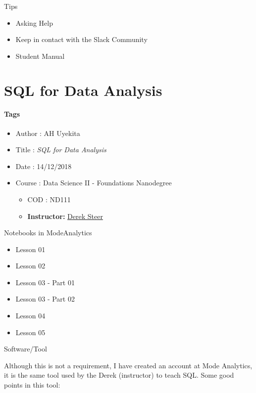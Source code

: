 \documentclass[]{book}
\providecommand{\tightlist}{%
  \setlength{\itemsep}{0pt}\setlength{\parskip}{0pt}}
\begin{document}
Tips

\begin{itemize}
\tightlist
\item
  Asking Help
\item
  Keep in contact with the Slack Community
\item
  Student Manual
\end{itemize}

\chapter{SQL for Data Analysis}\label{sql-for-data-analysis}

\subsubsection*{Tags}\label{tags}

\begin{itemize}
\tightlist
\item
  Author : AH Uyekita
\item
  Title : \emph{SQL for Data Analysis}
\item
  Date : 14/12/2018
\item
  Course : Data Science II - Foundations Nanodegree

  \begin{itemize}
  \tightlist
  \item
    COD : ND111
  \item
    \textbf{Instructor:} \href{https://modeanalytics.com}{Derek Steer}
  \end{itemize}
\end{itemize}

Notebooks in ModeAnalytics

\begin{itemize}
\tightlist
\item
  Lesson 01
\item
  Lesson 02
\item
  Lesson 03 - Part 01
\item
  Lesson 03 - Part 02
\item
  Lesson 04
\item
  Lesson 05
\end{itemize}

Software/Tool

Although this is not a requirement, I have created an account at Mode
Analytics, it is the same tool used by the Derek (instructor) to teach
SQL. Some good points in this tool:
\end{document}
